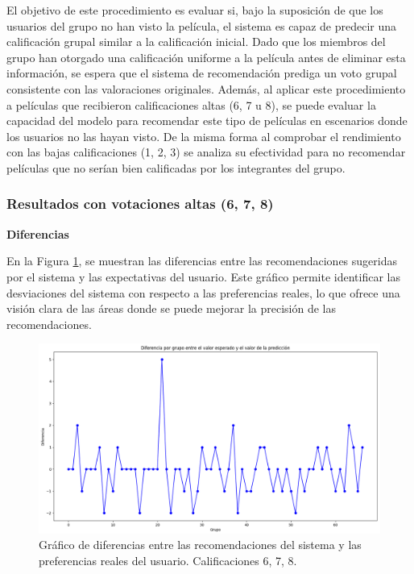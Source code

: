 \documentclass[twocolumn, fontsize=10pt]{article}
\begin{document}
El objetivo de este procedimiento es evaluar si, bajo la suposición de que los usuarios del grupo no han visto la película, el sistema es capaz de predecir una calificación grupal similar a la calificación inicial. Dado que los miembros del grupo han otorgado una calificación uniforme a la película antes de eliminar esta información, se espera que el sistema de recomendación prediga un voto grupal consistente con las valoraciones originales. Además, al aplicar este procedimiento a películas que recibieron calificaciones altas (6, 7 u 8), se puede evaluar la capacidad del modelo para recomendar este tipo de películas en escenarios donde los usuarios no las hayan visto. De la misma forma al comprobar el rendimiento con las bajas calificaciones (1, 2, 3) se analiza su efectividad para no recomendar películas que no serían bien calificadas por los integrantes del grupo.

\subsubsection{Resultados con votaciones altas (6, 7, 8)}

\textbf{Diferencias}

En la Figura \ref{fig:diferencias}, se muestran las diferencias entre las recomendaciones sugeridas por el sistema y las expectativas del usuario. Este gráfico permite identificar las desviaciones del sistema con respecto a las preferencias reales, lo que ofrece una visión clara de las áreas donde se puede mejorar la precisión de las recomendaciones.

\begin{figure}[h]
    \centering
    \includegraphics[width=\columnwidth]{assets/Diferencias678.png}
    \caption{Gráfico de diferencias entre las recomendaciones del sistema y las preferencias reales del usuario. Calificaciones 6, 7, 8.}
    \label{fig:diferencias}
\end{figure}
\end{document}

